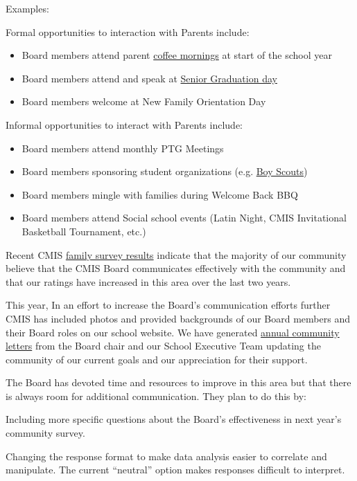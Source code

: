 \begin{findings}
Examples:

Formal opportunities to interaction with Parents include:
\begin{itemize}
\item Board members attend parent \href{https://drive.google.com/a/cmis.ac.th/file/d/0Bwny3HLdIIS7d1FGeDhaZE1EcG1PMHlMX2NRZTdIYXlWZERB/view?usp=sharing}{coffee mornings} at start of the school year
\item Board members attend and speak at \href{https://drive.google.com/a/cmis.ac.th/file/d/0Bwny3HLdIIS7NGpoVEtlWmw2RE0/view?usp=sharing}{Senior Graduation day}
\item Board members welcome at New Family Orientation Day
\end{itemize}

Informal opportunities to interact with Parents include:
\begin{itemize}
\item Board members attend monthly PTG Meetings
\item Board members sponsoring student organizations (e.g. \href{https://drive.google.com/a/cmis.ac.th/file/d/0Bwny3HLdIIS7WXpial9KYjFlWFBBQW1YQ2thOVpsTTFCeGVr/view?usp=sharing}{Boy Scouts})
\item Board members mingle with families during Welcome Back BBQ
\item Board members attend Social school events (Latin Night, CMIS Invitational Basketball Tournament, etc.)
\end{itemize}


Recent CMIS \href{https://docs.google.com/a/cmis.ac.th/document/d/1_otvw47y3Z-1CSjXnKhgRTauVRqPl1S6nSdmsb00O2k/edit?usp=sharing}{family survey results} indicate that the majority of our community believe that the CMIS Board communicates effectively with the community and that our ratings have increased in this area over the last two years.

This year, In an effort to increase the Board's communication efforts further CMIS has included photos and provided backgrounds of our Board members and their Board roles on our school website. We have generated \href{https://drive.google.com/a/cmis.ac.th/file/d/0Bwny3HLdIIS7MjJMX1ZIVS1zSXJOaTNZcFRmTWV1Q1VTc1hZ/view?usp=sharing}{annual community letters} from the Board chair and our School Executive Team updating the community of our current goals and our appreciation for their support.


The Board has devoted time and resources to improve in this area but that there is always room for additional communication. They plan to do this by:

Including more specific questions about the Board’s effectiveness in next year’s community survey. 

Changing the response format to make data analysis easier to correlate and manipulate. The current ``neutral'' option makes responses difficult to interpret.
\end{findings}

